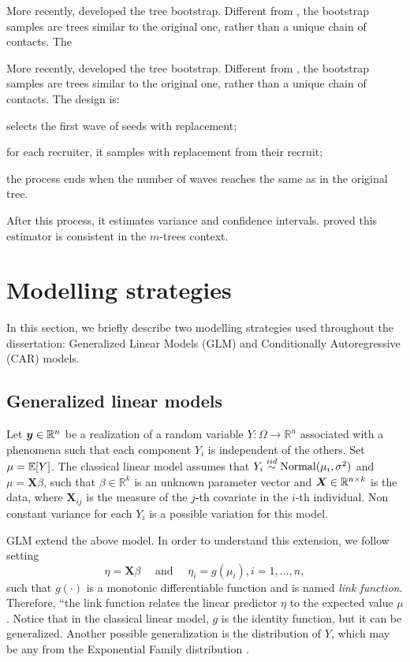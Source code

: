 More recently,  developed the tree bootstrap. 
Different from , the bootstrap samples
are trees similar to the original one, rather than a unique chain of contacts.
The 

More recently, \textcite{baraff2016estimating} developed the tree bootstrap.
Different from \textcite{salganik2006variance}, the bootstrap samples are
trees similar to the original one, rather than a unique chain of contacts. The
design is:
\begin{alineas}
  \item selects the first wave of seeds with replacement; 
  \item for each recruiter, it samples with replacement from their recruit;
  \item the process ends when the number of waves reaches the same as in the original tree. 
\end{alineas}
After this process, it estimates variance and confidence intervals.
\textcite{green2020consistency} proved this estimator is consistent in the
$m$-trees context.

\section{Modelling strategies}

In this section, we briefly describe two modelling strategies used
throughout the dissertation: Generalized Linear Models (GLM) and Conditionally
Autoregressive (CAR) models. 

\subsection{Generalized linear models}
\label{sec:glm}

Let $\boldsymbol{y} \in \mathbb{R}^n$ be a realization of a random variable $Y :
\Omega \to \mathbb{R}^n$ associated with a phenomena such that each component
$Y_i$ is independent of the others. Set $\mu = \mathbb{E}[Y]$. The classical linear
model assumes that $Y_i \overset{iid}{\sim} \operatorname{Normal}(\mu_i, \sigma^2)$ and $\mu =
\boldsymbol{X}\beta$, such that $\beta \in \mathbb{R}^k$ is an unknown parameter vector and
$\boldsymbol{X} \in \mathbb{R}^{n \times k}$ is the data, where $\boldsymbol{X}_{ij}$
is the measure of the $j$-th covariate in the $i$-th individual. Non constant
variance for each $Y_i$ is a possible variation for this model. 

GLM extend the above model. In order to understand
this extension, we follow \textcite[p. 27]{mccullagh2019generalized} setting 
\begin{equation*}
  \eta = \boldsymbol{X}\beta \quad \text{ and } \quad \eta_i = g(\mu_i), i = 1, \dots, n,
\end{equation*}
such that $g(\cdot)$ is a monotonic differentiable function and is named {\em
link function}. Therefore, ``the link function relates the linear predictor
$\eta$ to the expected value $\mu$ \cite[p. 31]{mccullagh2019generalized}.
Notice that in the classical linear model, $g$ is the identity function, but
it can be generalized. Another possible generalization is the distribution of
$Y$, which may be any from the Exponential Family distribution \cite[p.
115]{Robert2007}. 

